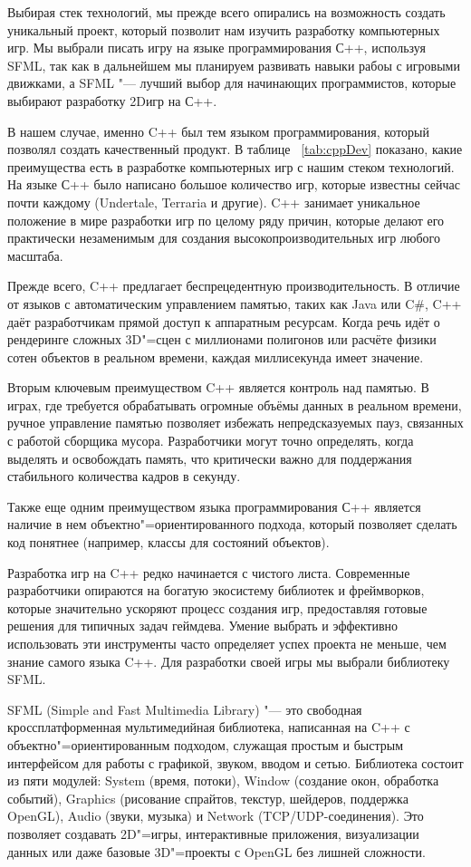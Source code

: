Выбирая стек технологий, мы прежде всего опирались на возможность создать уникальный проект, который позволит нам изучить разработку компьютерных игр. Мы выбрали писать игру на языке программирования С++, используя  SFML, так как в дальнейшем мы планируем развивать навыки рабоы с игровыми движками, а SFML "--- лучший выбор для начинающих программистов, которые выбирают разработку 2Dигр на С++.



В нашем случае, именно C++ был тем языком программирования, который позволял создать качественный продукт. В таблице ~\ref{tab:cppDev} показано, какие преимущества есть в разработке компьютерных игр с нашим стеком технологий. На языке С++ было написано большое количество игр, которые известны сейчас почти каждому (Undertale, Terraria и другие). C++ занимает уникальное положение в мире разработки игр по целому ряду причин, которые делают его практически незаменимым для создания высокопроизводительных игр любого масштаба. 

Прежде всего, C++ предлагает беспрецедентную производительность. В отличие от языков с автоматическим управлением памятью, таких как Java или C\#, C++ даёт разработчикам прямой доступ к аппаратным ресурсам. Когда речь идёт о рендеринге сложных 3D"=сцен с миллионами полигонов или расчёте физики сотен объектов в реальном времени, каждая миллисекунда имеет значение.\cite{aleksC++}

Вторым ключевым преимуществом C++ является контроль над памятью. В играх, где требуется обрабатывать огромные объёмы данных в реальном времени, ручное управление памятью позволяет избежать непредсказуемых пауз, связанных с работой сборщика мусора. Разработчики могут точно определять, когда выделять и освобождать память, что критически важно для поддержания стабильного количества кадров в секунду.

Также еще одним преимуществом языка программирования С++ является наличие в нем объектно"=ориентированного подхода, который позволяет сделать код понятнее (например, классы для состояний объектов).\cite{OOPC++}

Разработка игр на C++ редко начинается с чистого листа. Современные разработчики опираются на богатую экосистему библиотек и фреймворков, которые значительно ускоряют процесс создания игр, предоставляя готовые решения для типичных задач геймдева. Умение выбрать и эффективно использовать эти инструменты часто определяет успех проекта не меньше, чем знание самого языка C++. Для разработки своей игры мы выбрали библиотеку SFML.

SFML (Simple and Fast Multimedia Library) "--- это свободная кроссплатформенная мультимедийная библиотека, написанная на C++ с объектно"=ориентированным подходом, служащая простым и быстрым интерфейсом для работы с графикой, звуком, вводом и сетью. Библиотека состоит из пяти модулей: System (время, потоки), Window (создание окон, обработка событий), Graphics (рисование спрайтов, текстур, шейдеров, поддержка OpenGL), Audio (звуки, музыка) и Network (TCP/UDP-соединения). Это позволяет создавать 2D"=игры, интерактивные приложения, визуализации данных или даже базовые 3D"=проекты с OpenGL без лишней сложности. 
